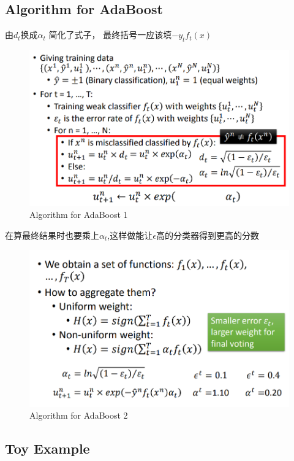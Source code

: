 \subsection{Algorithm for AdaBoost}
由$d_t$换成$\alpha_t$ 简化了式子， 最终括号一应该填$-y_tf_t(x)$
\begin{figure}[H]
    \centerline{\includegraphics[scale=0.3]{Part1/Chapter/images/algorithmforadaboost1.png}}
    \caption{Algorithm for AdaBoost 1}
\end{figure}

在算最终结果时也要乘上$\alpha_t$,这样做能让$\epsilon$高的分类器得到更高的分数
\begin{figure}[H]
    \centerline{\includegraphics[scale=0.3]{Part1/Chapter/images/afa2.png}}
    \caption{Algorithm for AdaBoost 2}
\end{figure}
\subsection{Toy Example}

